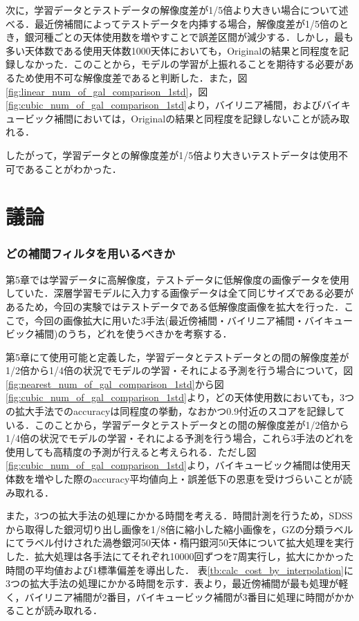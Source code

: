 \documentclass[a4j, 11pt]{jreport}
\begin{document}
次に，学習データとテストデータの解像度差が1/5倍より大きい場合について述べる．最近傍補間によってテストデータを内挿する場合，解像度差が1/5倍のとき，銀河種ごとの天体使用数を増やすことで誤差区間が減少する．しかし，最も多い天体数である使用天体数1000天体においても，Originalの結果と同程度を記録しなかった．このことから，モデルの学習が上振れることを期待する必要があるため使用不可な解像度差であると判断した．また，図\ref{fig:linear_num_of_gal_comparison_1std}，図\ref{fig:cubic_num_of_gal_comparison_1std}より，バイリニア補間，およびバイキュービック補間においては，Originalの結果と同程度を記録しないことが読み取れる．

したがって，学習データとの解像度差が1/5倍より大きいテストデータは使用不可であることがわかった．

\newpage
\section{議論}
\subsubsection{どの補間フィルタを用いるべきか}
第5章では学習データに高解像度，テストデータに低解像度の画像データを使用していた．深層学習モデルに入力する画像データは全て同じサイズである必要があるため，今回の実験ではテストデータである低解像度画像を拡大を行った．ここで，今回の画像拡大に用いた3手法(最近傍補間・バイリニア補間・バイキュービック補間)のうち，どれを使うべきかを考察する．

第5章にて使用可能と定義した，学習データとテストデータとの間の解像度差が1/2倍から1/4倍の状況でモデルの学習・それによる予測を行う場合について，図\ref{fig:nearest_num_of_gal_comparison_1std}から図\ref{fig:cubic_num_of_gal_comparison_1std}より，どの天体使用数においても，3つの拡大手法でのaccuracyは同程度の挙動，なおかつ0.9付近のスコアを記録している．このことから，学習データとテストデータとの間の解像度差が1/2倍から1/4倍の状況でモデルの学習・それによる予測を行う場合，これら3手法のどれを使用しても高精度の予測が行えると考えられる．ただし図\ref{fig:cubic_num_of_gal_comparison_1std}より，バイキュービック補間は使用天体数を増やした際のaccuracy平均値向上・誤差低下の恩恵を受けづらいことが読み取れる．

また，3つの拡大手法の処理にかかる時間を考える．時間計測を行うため，SDSSから取得した銀河切り出し画像を1/8倍に縮小した縮小画像を，GZの分類ラベルにてラベル付けされた渦巻銀河50天体・楕円銀河50天体について拡大処理を実行した．拡大処理は各手法にてそれぞれ10000回ずつを7周実行し，拡大にかかった時間の平均値および1標準偏差を導出した．
表\ref{tb:calc_cost_by_interpolation}に3つの拡大手法の処理にかかる時間を示す．表より，最近傍補間が最も処理が軽く，バイリニア補間が2番目，バイキュービック補間が3番目に処理に時間がかかることが読み取れる．
\end{document}
